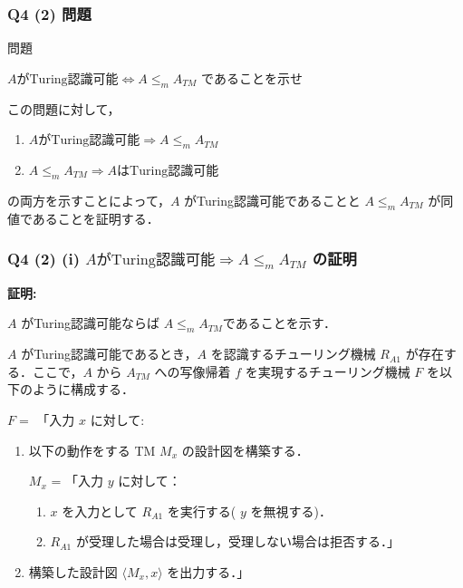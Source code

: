 \begin{frame}[fragile]
\frametitle{Q4 (2) 問題}

\begin{alertblock}{問題}

$A \text{がTuring認識可能} \Leftrightarrow A \le_{m} A_{TM}$ であることを示せ

\end{alertblock}

この問題に対して，

\begin{enumerate}
  \item[(i)] $A \text{がTuring認識可能} \Rightarrow A \le_{m} A_{TM}$
  \item[(ii)] $A \le_{m} A_{TM} \Rightarrow A \text{はTuring認識可能}$
\end{enumerate}

の両方を示すことによって，$A$ がTuring認識可能であることと $A \le_{m} A_{TM}$ が同値であることを証明する．

\end{frame}



\begin{frame}[fragile]
\frametitle{Q4 (2) \hspace{3mm} (i) $A \text{がTuring認識可能} \Rightarrow A \le_{m} A_{TM}$ の証明}

\textbf{証明:}

$A$ がTuring認識可能ならば $A \le_{m} A_{TM}$であることを示す．

$A$ がTuring認識可能であるとき，$A$ を認識するチューリング機械 $R_{A1}$ が存在する．ここで，$A$ から $A_{TM}$ への写像帰着 $f$ を実現するチューリング機械 $F$ を以下のように構成する．

$F =$ 「入力 $x$ に対して:

\begin{enumerate}
    \item 以下の動作をする TM $M_x$ の設計図を構築する．

     $M_x$ = 「入力 $y$ に対して：

    \begin{enumerate}
        \item[1.] $x$ を入力として $R_{A1}$ を実行する( $y$ を無視する)．
        \item[2.] $R_{A1}$ が受理した場合は受理し，受理しない場合は拒否する．」
    \end{enumerate}

    \item 構築した設計図 $\langle M_x, x \rangle$ を出力する．」

\end{enumerate}

\end{frame}



